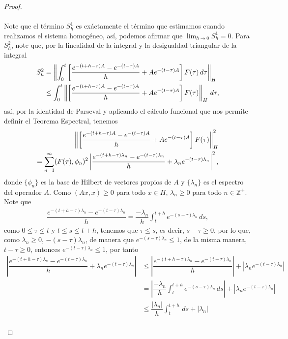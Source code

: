 \begin{proof}
\begin{enumerate}
\begin{align*}
    \end{align*}
    Note que el término $S_h^1$ es exáctamente el término que estimamos cuando realizamos el sistema homogéneo, así, podemos afirmar que $\displaystyle\lim_{h\to 0}S_h^1=0$. Para $S_h^2$, note que, por la linealidad de la integral y la desigualdad triangular de la integral
    \begin{align*}
        S_h^2&=\left\|\int_0^t\left[\dfrac{e^{-(t+h-\tau)A}-e^{-(t-\tau)A}}{h}+Ae^{-(t-\tau)A}\right]F(\tau)\, d\tau\right\|_H\\
        &\leq \int_0^t\left\|\left[\dfrac{e^{-(t+h-\tau)A}-e^{-(t-\tau)A}}{h}+Ae^{-(t-\tau)A}\right]F(\tau)\right\|_H\, d\tau,
    \end{align*}
    así, por la identidad de Parseval y aplicando el cálculo funcional que nos permite definir el Teorema Espectral, tenemos
    \begin{align*}
        \left\|\left[\dfrac{e^{-(t+h-\tau)A}-e^{-(t-\tau)A}}{h}+Ae^{-(t-\tau)A}\right]F(\tau)\right\|_H^2\\
        =\sum_{n=1}^\infty (F(\tau),\phi_n)^2\left|\dfrac{e^{-(t+h-\tau)\lambda_n}-e^{-(t-\tau)\lambda_n}}{h}+\lambda_ne^{-(t-\tau)\lambda_n}\right|^2, 
    \end{align*}
    donde $\{\phi_n\}$ es la base de Hilbert de vectores propios de $A$ y $\{\lambda_n\}$ es el espectro del operador $A$.
    Como $(Ax,x)\geq 0$ para todo $x \in H$, $\lambda_n\geq 0$ para todo $n\in \mathbb{Z}^+$. Note que
    \begin{align*}
        \dfrac{e^{-(t+h-\tau)\lambda_n}-e^{-(t-\tau)\lambda_n}}{h}=\dfrac{-\lambda_n}{h}\int_{t}^{t+h}e^{-(s-\tau)\lambda_n}\, ds,
    \end{align*}
    como $0\leq \tau\leq t$ y $t\leq s\leq t+h$, tenemos que $\tau\leq s$, es decir, $s-\tau \geq 0$, por lo que, como $\lambda_n\geq 0$, $-(s-\tau)\lambda_n$, de manera que $e^{-(s-\tau)\lambda_n}\leq 1$, de la misma manera, $t-\tau\geq 0$, entonces $e^{-(t-\tau)\lambda_n}\leq 1$, por tanto
    \begin{align*}
        \left|\dfrac{e^{-(t+h-\tau)\lambda_n}-e^{-(t-\tau)\lambda_n}}{h}+\lambda_ne^{-(t-\tau)\lambda_n}\right|&\leq \left|\dfrac{e^{-(t+h-\tau)\lambda_n}-e^{-(t-\tau)\lambda_n}}{h}\right|+\left|\lambda_ne^{-(t-\tau)\lambda_n}\right|\\
        &=\left|\dfrac{-\lambda_n}{h}\int_{t}^{t+h}e^{-(s-\tau)\lambda_n}\, ds\right|+\left|\lambda_ne^{-(t-\tau)\lambda_n}\right|\\
        &\leq \dfrac{|\lambda_n|}{h}\int_t^{t+h}\, ds+|\lambda_n|\\

\end{align*}
\end{enumerate}
\end{proof}
